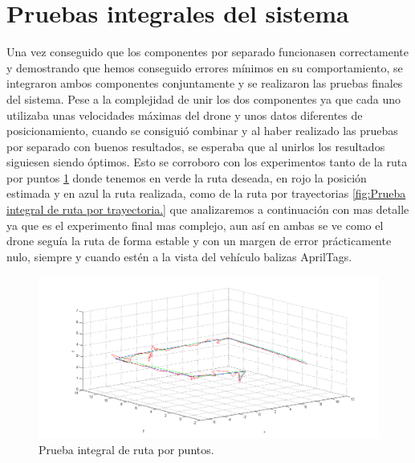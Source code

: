 \section{Pruebas integrales del sistema}
\hspace{1cm} Una vez conseguido que los componentes por separado funcionasen correctamente y demostrando que hemos conseguido errores mínimos en su comportamiento, se integraron ambos componentes conjuntamente y se realizaron las pruebas finales del sistema. Pese a la complejidad de unir los dos componentes ya que cada uno utilizaba unas velocidades máximas del drone y unos datos diferentes de posicionamiento, cuando se consiguió combinar y al haber realizado las pruebas por separado con buenos resultados, se esperaba que al unirlos los resultados siguiesen siendo óptimos. Esto se corroboro con los experimentos tanto de la ruta por puntos \ref{fig:Prueba integral de ruta por puntos.} donde tenemos en verde la ruta deseada, en rojo la posición estimada y en azul la ruta realizada, como de la ruta por trayectorias \ref{fig:Prueba integral de ruta por trayectoria.} que analizaremos a continuación con mas detalle ya que es el experimento final mas complejo, aun así en ambas se ve como el drone seguía la ruta de forma estable y con un margen de error prácticamente nulo, siempre y cuando estén a la vista del vehículo balizas AprilTags. 

\begin{figure}[H]
	\begin{center}
		\includegraphics[width=1\textwidth]{imag/IMG42.png}
				\caption{Prueba integral de ruta por puntos.}
		\label{fig:Prueba integral de ruta por puntos.}	
	\end{center}
\end{figure}

